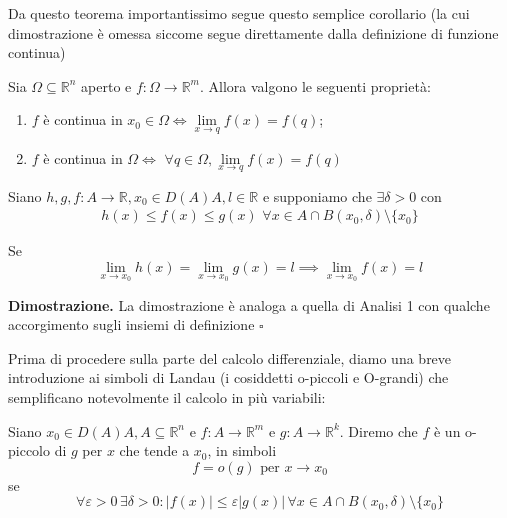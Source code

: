 \vspace{0.5cm}
\noindent Da questo teorema importantissimo segue questo semplice corollario (la cui dimostrazione è omessa siccome segue direttamente dalla definizione di funzione continua)
\begin{cor}
	Sia $\Omega \subseteq \mathbb{R}^n$ aperto e $f: \Omega \to \mathbb{R}^m$. Allora valgono le seguenti proprietà:
	\begin{enumerate}[label=\protect\circled{\arabic*}]
		\item $f$ è continua in $x_0 \in \Omega \iff \lim\limits_{x \to q} f(x) = f(q)$;
		\item $f$ è continua in $\Omega \iff \, \, \forall q \in \Omega, \lim\limits_{x \to q} f(x) = f(q)$
	\end{enumerate}
\end{cor}

\vspace{0.5cm}
\begin{theorem}[\textcolor{blue}{del confronto}]
Siano $h, g, f: A \to \mathbb{R}, x_0 \in D(A) A, l \in \mathbb{R}$ e supponiamo che $\exists \delta > 0$ con
\[\begin{aligned}
h(x) \leq f(x) \leq g(x) \, \, \forall x \in A \cap B(x_0, \delta) \setminus \{ x_0 \}
\end{aligned}\]

Se 
$$\lim\limits_{x \to x_0} h(x) = \lim\limits_{x \to x_0} g(x) = l \implies \lim_{x \to x_0} f(x) = l$$
\end{theorem}

\noindent \textbf{Dimostrazione. }
La dimostrazione è analoga a quella di Analisi 1 con qualche accorgimento sugli insiemi di definizione
\hfill $\square$

\noindent Prima di procedere sulla parte del calcolo differenziale, diamo una breve introduzione ai simboli di Landau (i cosiddetti o-piccoli e O-grandi) che semplificano notevolmente il calcolo in più variabili:

\vspace{0.5cm}
\begin{definition}[\textcolor{blue}{o-piccolo}]
Siano $x_0 \in D(A) A, A \subseteq \mathbb{R}^n$ e $f: A \to \mathbb{R}^m$ e $g: A \to \mathbb{R}^k$. Diremo che $f$ è un o-piccolo di $g$ per $x$ che tende a $x_0$, in simboli
$$
f = o(g) \text{ per } x \to x_0
$$
se $$\forall \varepsilon > 0 \, \exists \delta > 0 : |f(x)| \leq \varepsilon |g(x)| \, \forall x \in A \cap B(x_0, \delta) \setminus \{ x_0 \}$$
\end{definition}

